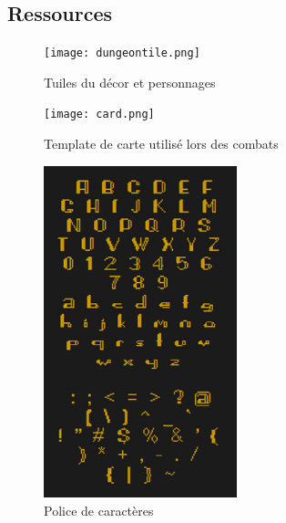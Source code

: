 \documentclass[a4paper,12pt]{article}
\begin{document}
\subsection{Ressources}

\begin{figure}[h]
\begin{center}
\texttt{[image: dungeontile.png]}
\caption{\label{tiles}Tuiles du décor et personnages}
\end{center}
\end{figure}

\begin{figure}[h]
\begin{center}
\texttt{[image: card.png]}
\caption{\label{card}Template de carte utilisé lors des combats}
\end{center}
\end{figure}

\begin{figure}[h]
\begin{center}
\includegraphics[width=0.5\textwidth]{font.png}
\caption{\label{font}Police de caractères}
\end{center}
\end{figure}
\end{document}
